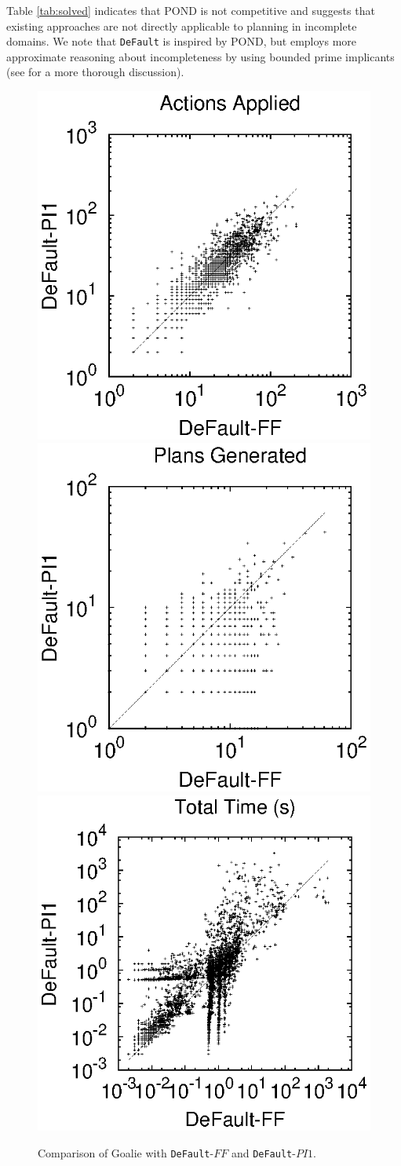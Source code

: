 \documentclass[letterpaper]{article}
\def\default{{\tt DeFault}}
\def\citep#1{\cite{#1}}
\begin{document}
Table \ref{tab:solved} indicates that POND is not competitive and suggests that
existing approaches are not directly applicable to planning in incomplete
domains.  We note that \default{} is inspired by POND, but employs more
approximate reasoning about incompleteness by using bounded prime implicants
(see \citep{USU-CS-TR-11-001} for a more thorough discussion). 

 
  
\begin{figure}[t]    
\hspace*{-1cm}
\includegraphics[width=.42\linewidth]{./WeberBryceICAPS11Fig3a.eps}\hspace*{-1.5cm}
\includegraphics[width=.42\linewidth]{./WeberBryceICAPS11Fig3b.eps}\hspace*{-1.5cm}
\includegraphics[width=.42\linewidth]{./WeberBryceICAPS11Fig3c.eps} 
\caption{\label{fig:exec} Comparison of Goalie with \default-$FF$ and
\default-$PI1$.}
\end{figure}		   
\end{document}
